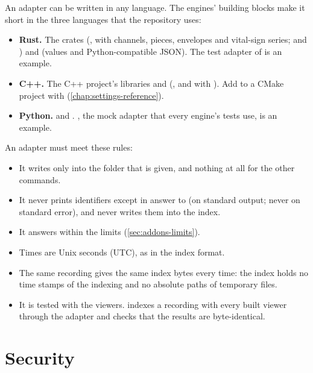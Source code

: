 An adapter can be written in any language. The engines' building blocks make it short in the
three languages that the repository uses:
\begin{itemize}
\item \textbf{Rust.} The crates  (, with channels, pieces,
  envelopes and vital-sign series; and ) and 
  (values and Python-compatible JSON). The test adapter of 
  is an example.
\item \textbf{C++.} The C++ project's libraries  and 
  (, and  with ). Add
   to a CMake project with 
  (\cref{chap:settings-reference}).
\item \textbf{Python.}  and
  . , the mock
  adapter that every engine's tests use, is an example.
\end{itemize}
An adapter must meet these rules:
\begin{itemize}
\item It writes only into the folder that  is given, and nothing at all for the other
  commands.
\item It never prints identifiers except in answer to  (on standard output; never
  on standard error), and never writes them into the index.
\item It answers within the limits (\cref{sec:addons-limits}).
\item Times are Unix seconds (UTC), as in the index format.
\item The same recording gives the same index bytes every time: the index holds no time stamps of
  the indexing and no absolute paths of temporary files.
\item It is tested with the viewers.  indexes a recording with every built viewer through the adapter
  and checks that the results are byte-identical.
\end{itemize}

\section{Security}
\label{sec:addons-security}

